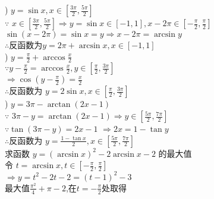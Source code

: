 \documentclass{article}
\newcommand \row[1]{$\displaystyle #1$}
\begin{document}
) \row{y=\sin{x},x\in [\frac{3\pi}{2},\frac{5\pi}{2}]} \\
$\because$ \row{x\in [\frac{3\pi}{2},\frac{5\pi}{2}] \Longrightarrow y=\sin{x}\in[-1,1], x-2\pi\in [-\frac{\pi}{2},\frac{\pi}{2}]}\\
\row{\sin{(x-2\pi)}=\sin{x}=y\Longrightarrow x-2\pi=\arcsin{y}} \\
$\therefore$反函数为\row{y=2\pi +\arcsin{x},x\in [-1,1]}\\


) \row{y=\frac{\pi}{2}+\arccos{\frac{x}{2}}} \\
\row{\because y-\frac{\pi}{2}=\arccos{\frac{x}{2}},y\in [\frac{\pi}{2},\frac{3\pi}{2}]} \\
\row {\Longrightarrow \cos{(y-\frac{\pi}{2})}=\frac{x}{2}} \\
$\therefore$反函数为 \row{y=2\sin{x},x\in[\frac{\pi}{2},\frac{3\pi}{2}]} \\

)  \row{y=3\pi -\arctan{(2x-1)}}\\
$\because$ \row{3\pi-y= \arctan{(2x-1)}\Longrightarrow y\in [\frac{5\pi}{2},\frac{7\pi}{2}]}\\
\row{ \because \tan{(3\pi-y)}=2x-1}
\row{\Longrightarrow 2x=1-\tan{y}}\\
$\therefore$反函数为 \row{y=\frac{1-\tan{x}}{2},x\in [\frac{5\pi}{2},\frac{7\pi}{2}]}\\

 求函数 \row{y=(\arcsin{x})^2-2\arcsin{x}-2} 的最大值\\ 
令 \row{t=\arcsin{x},t\in [-\frac{\pi}{2},\frac{\pi}{2}]}\\ 
\row{\Longrightarrow y=t^2-2t-2 =(t-1)^2-3} \\
最大值\row{\frac{\pi^2}{4}+\pi -2},在\row{t=-\frac{\pi}{2}}处取得
\end{document}
